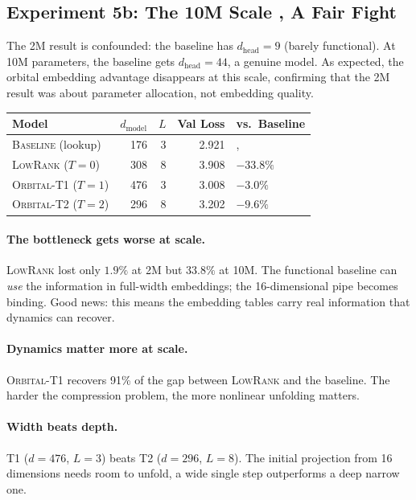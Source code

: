 \documentclass[11pt, a4paper]{article}
\theoremstyle{remark}
\begin{document}
\subsection{Experiment 5b: The 10M Scale ,  A Fair Fight}

The 2M result is confounded: the baseline has $d_{\text{head}} = 9$ (barely functional).
At 10M parameters, the baseline gets $d_{\text{head}} = 44$, a genuine model.
As expected, the orbital embedding advantage disappears at this scale, confirming that the 2M result was about parameter allocation, not embedding quality.

\begin{center}\small
\begin{tabular}{@{}lrrrl@{}}
\toprule
\textbf{Model} & $d_{\text{model}}$ & $L$ & \textbf{Val Loss} & \textbf{vs.\ Baseline} \\
\midrule
\textsc{Baseline} (lookup) & 176 & 3 & 2.921 & ,  \\
\textsc{LowRank} ($T{=}0$) & 308 & 8 & 3.908 & $-33.8\%$ \\
\textsc{Orbital-T1} ($T{=}1$) & 476 & 3 & 3.008 & $-3.0\%$ \\
\textsc{Orbital-T2} ($T{=}2$) & 296 & 8 & 3.202 & $-9.6\%$ \\
\bottomrule
\end{tabular}
\end{center}

\paragraph{The bottleneck gets worse at scale.}
\textsc{LowRank} lost only $1.9\%$ at 2M but $33.8\%$ at 10M.
The functional baseline can \emph{use} the information in full-width embeddings; the 16-dimensional pipe becomes binding.
Good news: this means the embedding tables carry real information that dynamics can recover.

\paragraph{Dynamics matter more at scale.}
\textsc{Orbital-T1} recovers 91\% of the gap between \textsc{LowRank} and the baseline.
The harder the compression problem, the more nonlinear unfolding matters.

\paragraph{Width beats depth.}
T1 ($d = 476$, $L = 3$) beats T2 ($d = 296$, $L = 8$).
The initial projection from 16 dimensions needs room to unfold, a wide single step outperforms a deep narrow one.
\end{document}
